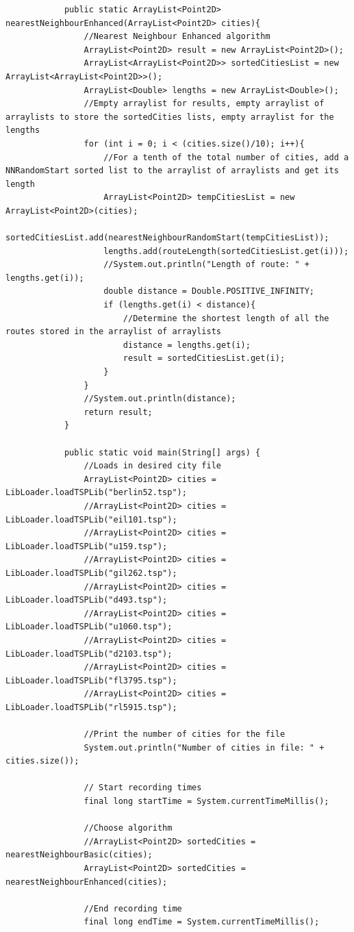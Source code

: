 \documentclass[conference,backref=page]{acmsiggraph}
\begin{document}
\begin{appendices}
\begin{lstlisting}
			public static ArrayList<Point2D> nearestNeighbourEnhanced(ArrayList<Point2D> cities){
				//Nearest Neighbour Enhanced algorithm
				ArrayList<Point2D> result = new ArrayList<Point2D>();
				ArrayList<ArrayList<Point2D>> sortedCitiesList = new ArrayList<ArrayList<Point2D>>();
				ArrayList<Double> lengths = new ArrayList<Double>();
				//Empty arraylist for results, empty arraylist of arraylists to store the sortedCities lists, empty arraylist for the lengths
				for (int i = 0; i < (cities.size()/10); i++){
					//For a tenth of the total number of cities, add a NNRandomStart sorted list to the arraylist of arraylists and get its length
					ArrayList<Point2D> tempCitiesList = new ArrayList<Point2D>(cities);
					sortedCitiesList.add(nearestNeighbourRandomStart(tempCitiesList));
					lengths.add(routeLength(sortedCitiesList.get(i)));
					//System.out.println("Length of route: " + lengths.get(i));
					double distance = Double.POSITIVE_INFINITY;
					if (lengths.get(i) < distance){
						//Determine the shortest length of all the routes stored in the arraylist of arraylists
						distance = lengths.get(i);
						result = sortedCitiesList.get(i);
					}
				}
				//System.out.println(distance);
				return result;
			}
			
			public static void main(String[] args) {
				//Loads in desired city file
				ArrayList<Point2D> cities = LibLoader.loadTSPLib("berlin52.tsp");
				//ArrayList<Point2D> cities = LibLoader.loadTSPLib("eil101.tsp");
				//ArrayList<Point2D> cities = LibLoader.loadTSPLib("u159.tsp");
				//ArrayList<Point2D> cities = LibLoader.loadTSPLib("gil262.tsp");
				//ArrayList<Point2D> cities = LibLoader.loadTSPLib("d493.tsp");
				//ArrayList<Point2D> cities = LibLoader.loadTSPLib("u1060.tsp");
				//ArrayList<Point2D> cities = LibLoader.loadTSPLib("d2103.tsp");
				//ArrayList<Point2D> cities = LibLoader.loadTSPLib("fl3795.tsp");
				//ArrayList<Point2D> cities = LibLoader.loadTSPLib("rl5915.tsp");
				
				//Print the number of cities for the file
				System.out.println("Number of cities in file: " + cities.size());
				
				// Start recording times
				final long startTime = System.currentTimeMillis();
				
				//Choose algorithm
				//ArrayList<Point2D> sortedCities = nearestNeighbourBasic(cities);
				ArrayList<Point2D> sortedCities = nearestNeighbourEnhanced(cities);
				
				//End recording time
				final long endTime = System.currentTimeMillis();			
				

\end{lstlisting}
\end{appendices}
\end{document}
